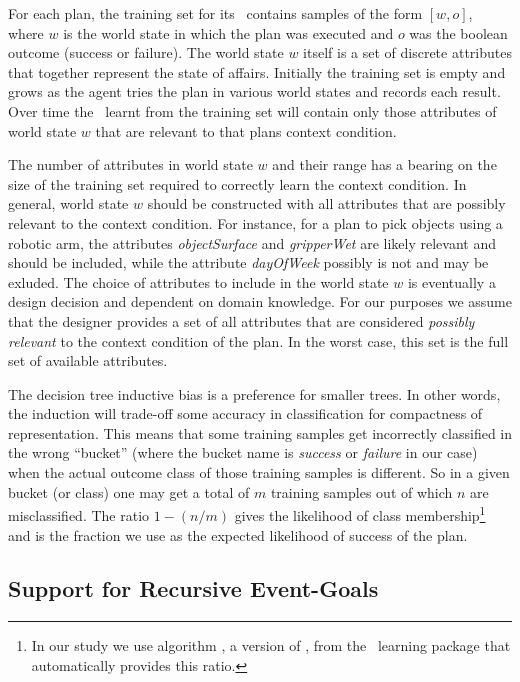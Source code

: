 For each plan, the training set for its \dt\ contains samples of the form $[w,o]$, where $w$ is the world state in which the plan was executed and $o$ was the boolean outcome (success or failure). The world state $w$ itself is a set of discrete attributes that together represent the state of affairs. Initially the training set is empty and grows as the agent tries the plan in various world states and records each result. Over time the \dt\ learnt from the training set will contain only those attributes of world state $w$ that are relevant to that plans context condition.

The number of attributes in world state $w$ and their range has a bearing on the size of the training set required to correctly learn the context condition. In general, world state $w$ should be constructed with all attributes that are possibly relevant to the context condition. For instance, for a plan to pick objects using a robotic arm, the attributes \textit{objectSurface} and \textit{gripperWet} are likely relevant and should be included, while the attribute \textit{dayOfWeek} possibly is not and may be exluded. The choice of attributes to include in the world state $w$ is eventually a design decision and dependent on domain knowledge. For our purposes we assume that the designer provides a set of all attributes that are considered \textit{possibly relevant} to the context condition of the plan. In the worst case, this set is the full set of available attributes. 

The decision tree inductive bias is a preference for smaller trees. In other words, the induction will trade-off some accuracy in classification for compactness of representation. 
This means that some training samples get incorrectly classified in the wrong ``bucket'' (where the bucket name is {\it success} or {\it failure} in our case) when the actual outcome class of those training samples is different. So in a given bucket (or class) one may get a total of $m$ training samples out of which $n$ are misclassified. The ratio $1-(n/m)$ gives the likelihood of class membership\footnote{In our study we use algorithm , a version of  \cite{Mitchell97:ML}, from the \weka\ learning package \cite{weka99} that automatically provides this ratio.} and is the fraction we use as the expected likelihood of success of the plan.


\subsection{Support for Recursive Event-Goals}

